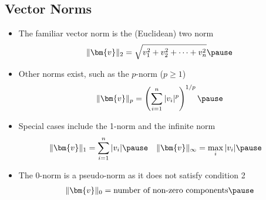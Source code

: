 \begin{slide}
\section[-2]{Vector Norms}

\begin{PauseHighLight}\small
  \begin{itemize}\squeeze
  \item The familiar vector norm is the (Euclidean) two norm
    \begin{align*}
      \| \bm{v} \|_2 = \sqrt{v_1^2 + v_2^2 + \cdots + v_n^2}\pause
    \end{align*}
  \item Other norms exist, such as the $p$-norm ($p\geq1$)
    \begin{align*}
      \| \bm{v} \|_p = \left(\sum_{i=1}^n | v_i |^p \right)^{1/p}\pause
    \end{align*}
  \item Special cases include the 1-norm and the infinite norm
    \begin{align*}
      \| \bm{v} \|_1 &= \sum_{i=1}^n | v_i |\pause & \| \bm{v} \|_{\infty} &= \max_i |v_i|\pause
    \end{align*}
  \item The 0-norm is a pseudo-norm as it does not satisfy condition 2
    \begin{align*}
      \| \bm{v} \|_0 = \text{number of non-zero components}\pause
    \end{align*}
  \end{itemize}
\end{PauseHighLight}

\end{slide}



